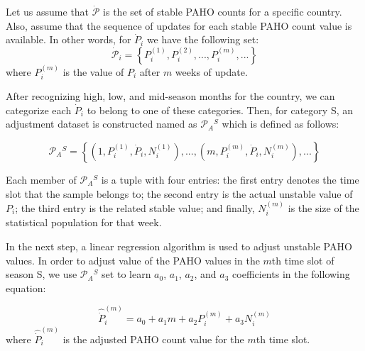 Let us assume that $\dot{\mathcal{P}}$ is the set of stable PAHO counts for a
specific country. Also, assume that the sequence of updates for each stable PAHO
count value is available. In other words, for $\dot{P}_i$ we have the following
set:
\vspace{-1em} 
\begin{equation}
\dot{\mathcal{P}}_i = \left \{P_i^{(1)},P_i^{(2)},...,P_i^{(m)},...  \right \}
\end{equation}
\noindent
where $P_i^{(m)}$ is the value of $P_i$ after $m$ weeks of update.

After recognizing high, low, and mid-season months for the country, we can
categorize each $\dot{P}_i$ to belong to one of these categories. Then, for
category S, an adjustment dataset is constructed named as $\mathcal{P}_A{^S}$
which is defined as follows:

\vspace{-1em} 
\begin{equation}
\mathcal{P}_A{^S} = \left \{ (1,P_i^{(1)},\dot{P}_i,N_i^{(1)}),...,(m,P_i^{(m)},\dot{P}_i,N_i^{(m)}), ...  \right \}
\end{equation}

Each member of $\mathcal{P}_A{^S}$ is a tuple with four entries: the first entry denotes
the time slot that the sample belongs to; the second entry is the actual unstable
value of $P_i$; the third entry is the related stable value; and finally,
$N_i^{(m)}$ is the size of the statistical population for that week.

In the next step, a linear regression algorithm is used to adjust unstable PAHO
values. In order to adjust value of the PAHO values in the $m$th time slot of
season S, we use $\mathcal{P}_A{^S}$ set to learn $a_0$, $a_1$, $a_2$, and
$a_3$ coefficients in the following equation:

\vspace{-1em} 
\begin{equation}
\hat{\dot{P}}_i^{(m)} = a_0 + a_1  m + a_2  P_i^{(m)} + a_3  N_i^{(m)}
\label{eq:correctionpaho}
\end{equation}
\noindent
where $\hat{\dot{P}}_i^{(m)}$ is the adjusted PAHO count value for the $m$th time slot.

